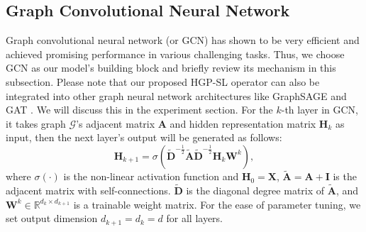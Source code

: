 \documentclass[letterpaper]{article} \usepackage{aaai20}  \usepackage{times}  \usepackage{helvet} \usepackage{courier}  \usepackage[hyphens]{url}  \usepackage{graphicx} \urlstyle{rm} \def\UrlFont{\rm}  \usepackage{graphicx}  \frenchspacing  \setlength{\pdfpagewidth}{8.5in}  \setlength{\pdfpageheight}{11in}
\begin{document}
\subsection{Graph Convolutional Neural Network}
Graph convolutional neural network (or GCN) \cite{kipf2016semi} has shown to be very efficient and achieved promising performance in various challenging tasks. Thus, we choose GCN as our model's building block and briefly review its mechanism in this subsection. Please note that our proposed HGP-SL operator can also be integrated into other graph neural network architectures like GraphSAGE \cite{hamilton2017inductive} and GAT \cite{velivckovic2017graph}. We will discuss this in the experiment section. For the $k$-th layer in GCN, it takes graph $\mathcal{G}$'s adjacent matrix $\mathbf{A}$ and hidden representation matrix $\mathbf{H}_k$ as input, then the next layer's output will be generated as follows:
\begin{equation}
	\mathbf{H}_{k+1} = \sigma(\tilde{\mathbf{D}}^{-\frac{1}{2}}\tilde{\mathbf{A}}\tilde{\mathbf{D}}^{-\frac{{1}}{2}}\mathbf{H}_k\mathbf{W}^k),
	\label{eq:conv}
\end{equation}
where $\sigma(\cdot)$ is the non-linear activation function and $\mathbf{H}_0 = \mathbf{X}$, $\tilde{\mathbf{A}} = \mathbf{A} + \mathbf{I}$ is the adjacent matrix with self-connections. $\tilde{\mathbf{D}}$ is the diagonal degree matrix of $\tilde{\mathbf{A}}$, and $\mathbf{W}^k \in \mathbb{R}^{d_k \times d_{k+1}}$ is a trainable weight matrix. For the ease of parameter tuning, we set output dimension $d_{k+1} = d_k = d$ for all layers.
\end{document}
